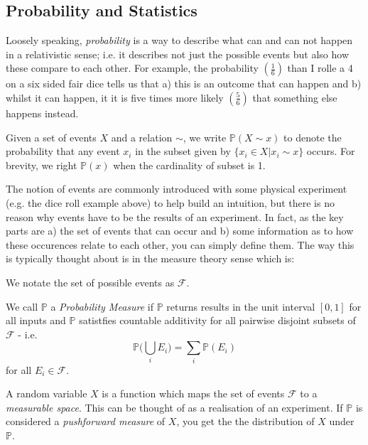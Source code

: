 \documentclass[../../Axiomathic.tex]{subfiles}
\begin{document}
\subsection{Probability and Statistics}
Loosely speaking, \textit{probability} is a way to describe what can and can not happen in a relativistic sense; i.e. it describes not just the possible events but also how these compare to each other. For example, the probability $\left( \frac{1}{6} \right)$ than I rolle a 4 on a six sided fair dice tells us that a) this is an outcome that can happen and b) whilst it can happen, it it is five times more likely $\left( \frac{5}{6} \right)$ that something else happens instead. 
\begin{nota}
Given a set of events $X$ and a relation $\sim$, we write $\mathbb{P}(X \sim x)$ to denote the probability that any event $x_i$ in the subset given by $\{x_i \in X \vert x_i \sim x\}$ occurs. For brevity, we right $\mathbb{P}(x)$ when the cardinality of subset is 1.
\end{nota}
The notion of events are commonly introduced with some physical experiment (e.g. the dice roll example above) to help build an intuition, but there is no reason why events have to be the results of an experiment. In fact, as the key parts are a) the set of events that can occur and b) some information as to how these occurences relate to each other, you can simply define them. The way this is typically thought about is in the measure theory sense which is:
\begin{nota}
We notate the set of possible events as $\mathcal{F}$. 
\end{nota}
\begin{defn}
We call $\mathbb{P}$ a \textit{Probability Measure} if $\mathbb{P}$ returns results in the unit interval $[0,1]$ for all inputs and $\mathbb{P}$ satistfies countable additivity for all pairwise disjoint subsets of $\mathcal{F}$ - i.e. 
\[\mathbb{P}\biggl( \bigcup_i E_i \biggr) = \sum_i \mathbb{P}(E_i)\] for all $E_i \in \mathcal{F}$.
\end{defn}
\begin{defn}
A random variable $X$ is a function which maps the set of events $\mathcal{F}$ to a \textit{measurable space}. This can be thought of as a realisation of an experiment. If $\mathbb{P}$ is considered a \textit{pushforward measure} of $X$, you get the the distribution of $X$ under $\mathbb{P}$.
\end{defn}
\end{document}
